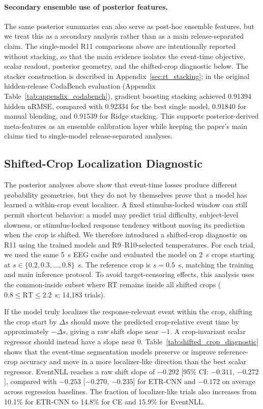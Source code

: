 \documentclass[12pt]{article}
\begin{document}
\paragraph{Secondary ensemble use of posterior features.}
The same posterior summaries can also serve as post-hoc ensemble features, but we treat this as a secondary analysis rather than as a main release-separated claim. The single-model R11 comparisons above are intentionally reported without stacking, so that the main evidence isolates the event-time objective, scalar readout, posterior geometry, and the shifted-crop diagnostic below. The stacker construction is described in Appendix~\ref{sec:rt_stacking}; in the original hidden-release CodaBench evaluation (Appendix Table~\ref{tab:appendix_codabench}), gradient boosting stacking achieved 0.91394 hidden nRMSE, compared with 0.92334 for the best single model, 0.91840 for manual blending, and 0.91539 for Ridge stacking. This supports posterior-derived meta-features as an ensemble calibration layer while keeping the paper's main claims tied to single-model release-separated analyses.

\subsection{Shifted-Crop Localization Diagnostic}

The posterior analyses above show that event-time losses produce different probability geometries, but they do not by themselves prove that a model has learned a within-crop event localizer. A fixed stimulus-locked window can still permit shortcut behavior: a model may predict trial difficulty, subject-level slowness, or stimulus-locked response tendency without moving its prediction when the crop is shifted. We therefore introduced a shifted-crop diagnostic on R11 using the trained models and R9--R10-selected temperatures. For each trial, we used the same 5~s EEG cache and evaluated the model on 2~s crops starting at $s\in\{0.2,0.3,\dots,0.8\}$~s. The reference crop is $s=0.5$~s, matching the training and main inference protocol. To avoid target-censoring effects, this analysis uses the common-inside subset where RT remains inside all shifted crops ($0.8\leq \mathrm{RT}\leq 2.2$~s; 14{,}183 trials).

If the model truly localizes the response-relevant event within the crop, shifting the crop start by $\Delta s$ should move the predicted crop-relative event time by approximately $-\Delta s$, giving a raw shift slope near $-1$. A crop-invariant scalar regressor should instead have a slope near 0. Table~\ref{tab:shifted_crop_diagnostic} shows that the event-time segmentation models preserve or improve reference-crop accuracy and move in a more localizer-like direction than the best scalar regressor. EventNLL reaches a raw shift slope of $-0.292$ [95\% CI: $-0.311$, $-0.272$], compared with $-0.253$ [$-0.270$, $-0.235$] for ETR-CNN and $-0.172$ on average across regression baselines. The fraction of localizer-like trials also increases from 10.1\% for ETR-CNN to 14.8\% for CE and 15.9\% for EventNLL.
\end{document}
